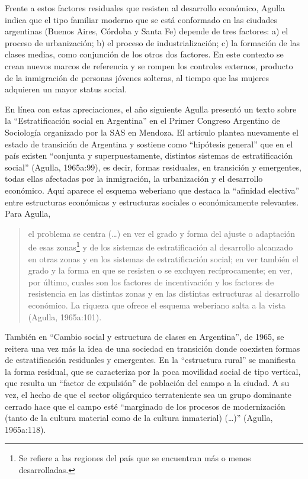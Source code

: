 Frente a estos factores residuales que resisten al desarrollo económico, Agulla indica que el tipo familiar moderno que se está conformado en las ciudades argentinas (Buenos Aires, Córdoba y Santa Fe) depende de tres factores: a) el proceso de urbanización; b) el proceso de industrialización; c) la formación de las clases medias, como conjunción de los otros dos factores. En este contexto se crean nuevos marcos de referencia y se rompen los controles externos, producto de la inmigración de personas jóvenes solteras, al tiempo que las mujeres adquieren un mayor status social.

En línea con estas apreciaciones, el año siguiente Agulla presentó un texto sobre la \enquote{Estratificación social en Argentina} en el Primer Congreso Argentino de Sociología organizado por la SAS en Mendoza. El artículo plantea nuevamente el estado de transición de Argentina y sostiene como \enquote{hipótesis general} que en el país existen \enquote{conjunta y superpuestamente, distintos sistemas de estratificación social} (Agulla, 1965a:99), es decir, formas residuales, en transición y emergentes, todas ellas afectadas por la inmigración, la urbanización y el desarrollo económico. Aquí aparece el esquema weberiano que destaca la \enquote{afinidad electiva} entre estructuras económicas y estructuras sociales o económicamente relevantes. Para Agulla,

\begin{quote}
el problema se centra (\dots) en ver el grado y forma del ajuste o adaptación de esas zonas\footnote{Se refiere a las regiones del país que se encuentran más o menos desarrolladas.} y de los sistemas de estratificación al desarrollo alcanzado en otras zonas y en los sistemas de estratificación social; en ver también el grado y la forma en que se resisten o se excluyen recíprocamente; en ver, por último, cuales son los factores de incentivación y los factores de resistencia en las distintas zonas y en las distintas estructuras al desarrollo económico. La riqueza que ofrece el esquema weberiano salta a la vista (Agulla, 1965a:101).
\end{quote}

También en \enquote{Cambio social y estructura de clases en Argentina}, de 1965, se reitera una vez más la idea de una sociedad en transición donde coexisten formas de estratificación residuales y emergentes. En la \enquote{estructura rural} se manifiesta la forma residual, que se caracteriza por la poca movilidad social de tipo vertical, que resulta un \enquote{factor de expulsión} de población del campo a la ciudad. A su vez, el hecho de que el sector oligárquico terrateniente sea un grupo dominante cerrado hace que el campo esté \enquote{marginado de los procesos de modernización (tanto de la cultura material como de la cultura inmaterial) (\dots)} (Agulla, 1965a:118).

